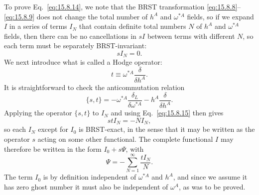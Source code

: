 To prove Eq.~\eqref{eq:15.8.14}, we note that the BRST transformation \eqref{eq:15.8.8}--\eqref{eq:15.8.9} does not change the total number of $h^A$ and $\omega^{*A}$ fields, so if we expand $I$ in a series of terms $I_N$ that contain definite total numbers $N$ of $h^A$ and $\omega^{*A}$ fields, then there can be no cancellations in $sI$ between terms with different $N$, so each term must be separately BRST-invariant:
\begin{equation}
 sI_N=0.
 \tag{15.8.15}\label{eq:15.8.15}
\end{equation}
We next introduce what is called a Hodge operator:
\begin{equation}
 t\equiv\omega^{*A}\frac{\delta}{\delta h^A}.
 \tag{15.8.16}\label{eq:15.8.16}
\end{equation}
It is straightforward to check the anticommutation relation
\begin{equation}
 \{s,t\}=-\omega^{*A}\frac{\delta_L}{\delta\omega^{*A}}-h^A\frac{\delta}{\delta h^A}.
 \tag{15.8.17}\label{eq:15.8.17}
\end{equation}
Applying the operator $\{s,t\}$ to $I_N$ and using Eq.~\eqref{eq:15.8.15} then gives
\begin{equation}
 stI_N=-NI_N,
 \tag{15.8.18}\label{eq:15.8.18}
\end{equation}
so each $I_N$ except for $I_0$ is BRST-exact, in the sense that it may be written as the operator $s$ acting on some other functional. The complete functional $I$ may therefore be written in the form $I_0+s\Psi$, with
\begin{equation}
 \Psi=-\sum_{N=1}^{\infty}\frac{tI_N}{N}.
 \tag{15.8.19}\label{eq:15.8.19}
\end{equation}
The term $I_0$ is by definition independent of $\omega^{*A}$ and $h^A$, and since we assume it has zero ghost number it must also be independent of $\omega^A$, as was to be proved.

